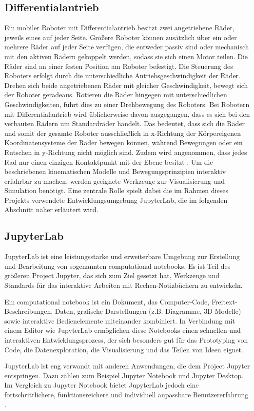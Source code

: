 \subsection{Differentialantrieb}
Ein mobiler Roboter mit Differentialantrieb besitzt zwei angetriebene Räder, jeweils eines auf jeder Seite.
Größere Roboter können zusätzlich über ein oder mehrere Räder auf jeder Seite verfügen, die entweder passiv sind oder mechanisch mit den aktiven Rädern gekoppelt werden,
sodass sie sich einen Motor teilen. Die Räder sind an einer festen Position am Roboter befestigt.
Die Steuerung des Roboters erfolgt durch die unterschiedliche Antriebsgeschwindigkeit der Räder.
Drehen sich beide angetriebenen Räder mit gleicher Geschwindigkeit, bewegt sich der Roboter geradeaus.
Rotieren die Räder hingegen mit unterschiedlichen Geschwindigkeiten, führt dies zu einer Drehbewegung des Roboters.
Bei Robotern mit Differentialantrieb wird üblicherweise davon ausgegangen, dass es sich bei den verbauten Rädern um Standardräder handelt.
Das bedeutet, dass sich die Räder und somit der gesamte Roboter ausschließlich in x-Richtung der Körpereigenen Koordinatensysteme der Räder bewegen können, während Bewegungen oder ein Rutschen in y-Richtung nicht möglich sind.
Zudem wird angenommen, dass jedes Rad nur einen einzigen Kontaktpunkt mit der Ebene besitzt
.
Um die beschriebenen kinematischen Modelle und Bewegungsprinzipien interaktiv erfahrbar zu machen, werden geeignete Werkzeuge zur Visualisierung und Simulation benötigt.
Eine zentrale Rolle spielt dabei die im Rahmen dieses Projekts verwendete Entwicklungsumgebung JupyterLab, die im folgenden Abschnitt näher erläutert wird.


\subsection{JupyterLab}
JupyterLab ist eine leistungsstarke und erweiterbare Umgebung zur Erstellung und Bearbeitung von sogenannten computational notebooks.
Es ist Teil des größeren Project Jupyter, das sich zum Ziel gesetzt hat, Werkzeuge und Standards für das interaktive Arbeiten mit Rechen-Notizbüchern zu entwickeln.

Ein computational notebook ist ein Dokument, das Computer-Code, Frei\-text-Be\-schrei\-bun\-gen, Daten,
grafische Darstellungen (z.B. Diagramme, 3D-Modelle) sowie interaktive Bedienelemente miteinander kombiniert.
In Verbindung mit einem Editor wie JupyterLab ermöglichen diese Notebooks einen schnellen und interaktiven Entwicklungsprozess,
der sich besonders gut für das Prototyping von Code, die Datenexploration, die Visualisierung und das Teilen von Ideen eignet.

JupyterLab ist eng verwandt mit anderen Anwendungen, die dem Project Jupyter entspringen.
Dazu zählen zum Beispiel Jupyter Notebook und Jupyter Desktop. Im Vergleich zu Jupyter Notebook bietet JupyterLab jedoch eine fortschrittlichere,
funktionsreichere und individuell anpassbare Benutzererfahrung .